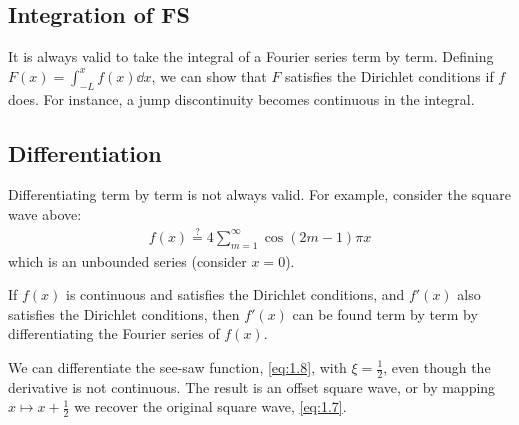     \subsection{Integration of FS}
    It is always valid to take the integral of a Fourier series term by term.
    Defining $F(x) = \int_{-L}^x f(x) \dd{x}$, we can show that $F$ satisfies the Dirichlet conditions if $f$ does.
    For instance, a jump discontinuity becomes continuous in the integral.

    \subsection{Differentiation}
    Differentiating term by term is not always valid.
    For example, consider the square wave above:
    \begin{align*}
        f(x) \stackrel{?}{=} 4 \sum_{m=1}^\infty \cos (2m-1)\pi x
    \end{align*}
    which is an unbounded series (consider $x = 0$).
    \begin{theorem}
        If $f(x)$ is continuous and satisfies the Dirichlet conditions, and $f'(x)$ also satisfies the Dirichlet conditions, then $f'(x)$ can be found term by term by differentiating the Fourier series of $f(x)$.
    \end{theorem}
    \begin{example}
        We can differentiate the see-saw function, \cref{eq:1.8}, with $\xi = \frac{1}{2}$, even though the derivative is not continuous.
        The result is an offset square wave, or by mapping $x \mapsto x + \frac{1}{2}$ we recover the original square wave, \cref{eq:1.7}.
    \end{example}

